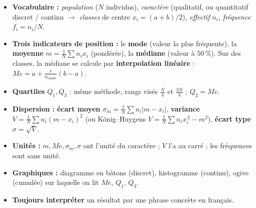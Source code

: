 \documentclass[11pt,a4paper]{article}
\newcommand{\ecm}{\sigma_m}              %
\newcommand{\ect}{\sigma}                %
\newcommand{\med}{M\!e}                  %
\begin{document}
\begin{tcolorbox}[boxbase,colback=primarydark!6,colframe=primarydark,
   title={\textsc{L'essentiel de la Fiche 8}}]
\begin{itemize}[leftmargin=1.5em,topsep=2pt,itemsep=2pt]
  \item \textbf{Vocabulaire :} \emph{population} ($N$ individus), \emph{caractère} (qualitatif, ou
        quantitatif discret / continu $\rightarrow$ \emph{classes} de centre $x_i=(a+b)/2$),
        \emph{effectif} $n_i$, \emph{fréquence} $f_i=n_i/N$.
  \item \textbf{Trois indicateurs de position :} le \textbf{mode} (valeur la plus fréquente), la
        \textbf{moyenne} $m=\frac{1}{N}\sum n_i x_i$ (pondérée), la \textbf{médiane} (valeur à
        $50\,\%$). Sur des classes, la médiane se calcule par \textbf{interpolation linéaire} :
        $\med=a+\frac{r}{n_{\text{classe}}}(b-a)$.
  \item \textbf{Quartiles} $Q_1,Q_3$ : même méthode, rangs visés $\tfrac{N}{4}$ et $\tfrac{3N}{4}$ ;
        $Q_2=\med$.
  \item \textbf{Dispersion :} \textbf{écart moyen} $\ecm=\frac{1}{N}\sum n_i|m-x_i|$, \textbf{variance}
        $V=\frac{1}{N}\sum n_i(m-x_i)^2$ (ou König--Huygens $V=\frac{1}{N}\sum n_i x_i^{\,2}-m^2$),
        \textbf{écart type} $\ect=\sqrt{V}$.
  \item \textbf{Unités :} $m,\med,\ecm,\ect$ ont l'unité du caractère ; $V$ l'a au carré ; les
        fréquences sont sans unité.
  \item \textbf{Graphiques :} diagramme en bâtons (discret), histogramme (continu), ogive
        (cumulée) sur laquelle on lit $\med$, $Q_1$, $Q_3$.
  \item \textbf{Toujours interpréter} un résultat par une phrase concrète en français.
\end{itemize}
\end{tcolorbox}
\end{document}
